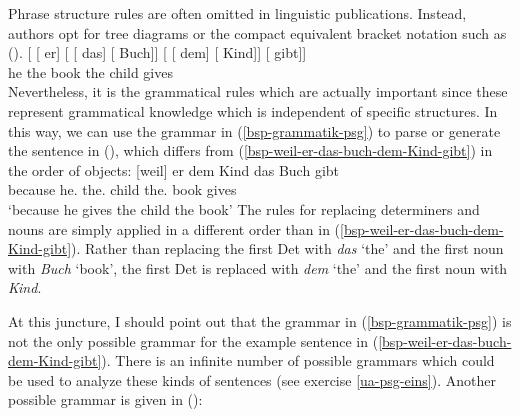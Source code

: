 Phrase structure rules are often omitted in linguistic publications. Instead, authors opt for tree diagrams or the compact equivalent bracket notation
such as ().
\ea
\gll {}[ [ er] [ [ das] [ Buch]]  [ [ dem] [ Kind]] [ gibt]]\\
     {}         {}        he  {}        {}       the  {}       book    {}        {}       the  {}       child     {}      gives\\  
\z
Nevertheless, it is the grammatical rules which are actually important since these represent grammatical knowledge which is independent of specific structures.
In this way, we can use the grammar in (\ref{bsp-grammatik-psg}) to parse or generate the sentence
in (), which differs from (\ref{bsp-weil-er-das-buch-dem-Kind-gibt}) in the order of objects: 
\ea
\gll {}[weil] er dem Kind das Buch gibt\\
	 {}\spacebr{}because he.\nom{} the.\dat{} child the.\acc{} book gives\\
\glt `because he gives the child the book'
\z
The rules for replacing determiners and nouns are simply applied in a different order than in (\ref{bsp-weil-er-das-buch-dem-Kind-gibt}). Rather than replacing the first Det with \emph{das} `the' and the first noun with \emph{Buch} `book', the first Det is replaced with \emph{dem} `the' and the first noun with \emph{Kind}.

\largerpage[2]
At this juncture, I should point out that the grammar in (\ref{bsp-grammatik-psg}) is not the only possible grammar for the example sentence in
(\ref{bsp-weil-er-das-buch-dem-Kind-gibt}). There is an infinite\label{page-unendlich-viele-grammatiken} number of possible grammars which could
be used to analyze these kinds of sentences (see exercise \ref{ua-psg-eins}). Another possible grammar is given in ():

